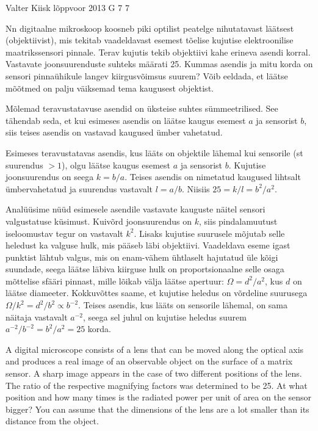{Valter Kiisk} %
{lõppvoor} %
{2013} %
{G 7} %
{7} %
{
\ifStatement
Nn digitaalne mikroskoop koosneb piki optilist peatelge nihutatavast
läätsest (objektiivist), mis tekitab vaadeldavast esemest tõelise kujutise
elektroonilise maatrikssensori pinnale. Terav kujutis tekib objektiivi kahe
erineva asendi korral. Vastavate joonsuurenduste suhteks määrati 25. Kummas
asendis ja mitu korda on sensori pinnaühikule langev kiirgusvõimsus suurem?
Võib eeldada, et läätse mõõtmed on palju väiksemad tema kaugusest objektist.
\fi


\ifHint
Mõlemad teravustatavuse asendid on üksteise suhtes sümmeetrilised. See tähendab seda, et kui esimeses asendis on läätse kaugus esemest $a$ ja sensorist $b$, siis teises asendis on vastavad kaugused ümber vahetatud.
\fi


\ifSolution
Esimeses teravustatavas asendis, kus lääts on objektile lähemal kui sensorile (st suurendus $>1$), olgu läätse kaugus esemest $a$ ja sensorist $b$. Kujutise joonsuurendus on seega $k=b/a$. Teises asendis on nimetatud kaugused lihtsalt ümbervahetatud ja suurendus vastavalt $l=a/b$. Niisiis $25=k/l=b^2/a^2$.

Analüüsime nüüd esimesele asendile vastavate kauguste näitel sensori valgustatuse küsimust. Kuivõrd joonsuurendus on $k$, siis pindalamuutust iseloomustav tegur on vastavalt $k^2$. Lisaks kujutise suurusele mõjutab selle heledust ka valguse hulk, mis pääseb läbi objektiivi. Vaadeldava eseme igast punktist lähtub valgus, mis on enam-vähem ühtlaselt hajutatud üle kõigi suundade, seega läätse läbiva kiirguse hulk on proportsionaalne selle osaga mõttelise sfääri pinnast, mille lõikab välja läätse apertuur: $\Omega=d^2/a^2$, kus $d$ on läätse diameeter. Kokkuvõttes saame, et kujutise heledus on võrdeline suurusega $\Omega/k^2=d^2/b^2\propto b^{-2}$. Teises asendis, kus lääts on sensorile lähemal, on sama näitaja vastavalt $a^{-2}$, seega sel juhul on kujutise heledus suurem $a^{-2}/b^{-2}=b^2/a^2=25$ korda.
\fi


\ifEngStatement
A digital microscope consists of a lens that can be moved along the optical axis and produces a real image of an observable object on the surface of a matrix sensor. A sharp image appears in the case of two different positions of the lens. The ratio of the respective magnifying factors was determined to be 25. At what position and how many times is the radiated power per unit of area on the sensor bigger? You can assume that the dimensions of the lens are a lot smaller than its distance from the object.
\fi


}
